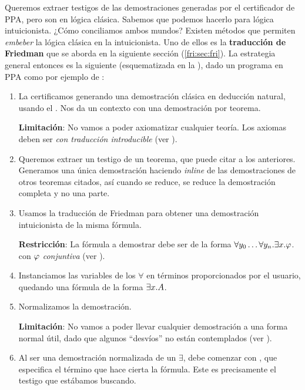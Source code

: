 Queremos extraer testigos de las demostraciones generadas por el certificador de
PPA, pero son en lógica clásica. Sabemos que podemos hacerlo para lógica
intuicionista. ¿Cómo conciliamos ambos mundos? Existen métodos que permiten
\textit{embeber} la lógica clásica en la intuicionista. Uno de ellos es la
\textbf{traducción de Friedman} que se aborda en la siguiente sección (\ref{fri:sec:fri}). La
estrategia general entonces es la siguiente (esquematizada en la ), dado un programa en PPA como
por ejemplo de :
\begin{enumerate}
    \item La certificamos generando una demostración clásica en deducción
          natural, usando el \modCertifier{}. Nos da un contexto con una demostración
          por teorema.

          \textbf{Limitación}: No vamos a poder axiomatizar cualquier teoría. Los axiomas deben ser \textit{con traducción introducible} (ver ).
    \item Queremos extraer un testigo de un teorema, que puede citar a los anteriores. Generamos una única demostración haciendo \textit{inline} de las demostraciones de otros teoremas citados, así cuando se reduce, se reduce la demostración completa y no una parte.
    \item Usamos la traducción de Friedman para obtener una demostración
          intuicionista de la misma fórmula.

          \textbf{Restricción}: La fórmula a demostrar debe ser de la forma
          $\forall y_0 \dots \forall y_n . \exists x . \varphi$. con $\varphi$ \textit{conjuntiva} (ver ).
    \item Instanciamos las variables de los $\forall$ en términos proporcionados
          por el usuario, quedando una fórmula de la forma $\exists x . A$.
    \item Normalizamos la demostración.

          \textbf{Limitación}: No vamos a poder llevar cualquier demostración a una forma normal útil, dado que algunos ``desvíos'' no están contemplados (ver ).

    \item Al ser una demostración normalizada de un $\exists$, debe comenzar con
          , que especifica el término que hace cierta la fórmula. Este
          es precisamente el testigo que estábamos buscando.
          \proofTreeExistsI
\end{enumerate}

